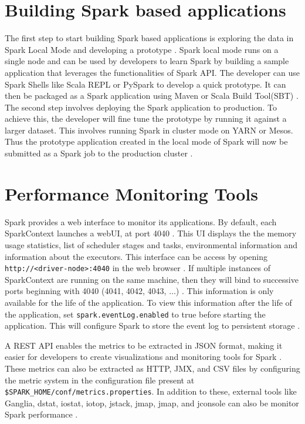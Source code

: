 \documentclass[9pt,twocolumn,twoside]{../../styles/osajnl}
\begin{document}
\section{Building Spark based applications}
The first step to start building Spark based applications is exploring
the data in Spark Local Mode and developing a prototype
\cite{www-hortonworks}. Spark local mode runs on a single node and can
be used by developers to learn Spark by building a sample application
that leverages the functionalities of Spark API. The developer can use
Spark Shells like Scala REPL or PySpark to develop a quick
prototype. It can then be packaged as a Spark application using Maven
or Scala Build Tool(SBT) \cite{www-hortonworks}.  The second step
involves deploying the Spark application to production. To achieve
this, the developer will fine tune the prototype by running it against
a larger dataset. This involves running Spark in cluster mode on YARN
or Mesos. Thus the prototype application created in the local mode of
Spark will now be submitted as a Spark job to the production cluster
\cite{www-hortonworks}.

\section{Performance Monitoring Tools}
Spark provides a web interface to monitor its applications. By
default, each SparkContext launches a webUI, at port 4040
\cite{www-spark-ui}. This UI displays the the memory usage statistics,
list of scheduler stages and tasks, environmental information and
information about the executors.  This interface can be access by
opening \texttt{http://<driver-node>:4040} in the web browser
\cite{www-spark-ui}.  If multiple instances of SparkContext are
running on the same machine, then they will bind to successive ports
beginning with 4040 (4041, 4042, 4043, $\ldots$)
\cite{www-spark-ui}. This information is only available for the life
of the application. To view this information after the life of the
application, set \texttt{spark.eventLog.enabled} to true before
starting the application.  This will configure Spark to store the
event log to persistent storage \cite{www-spark-ui}.

A REST API enables the metrics to be extracted in JSON format, making
it easier for developers to create visualizations and monitoring tools
for Spark \cite{www-spark-ui}.  These metrics can also be extracted as
HTTP, JMX, and CSV files by configuring the metric system in the
configuration file present at
\texttt{\$SPARK\_HOME/conf/metrics.properties}. In addition to these,
external tools like Ganglia, dstat, iostat, iotop, jstack, jmap, jmap,
and jconsole can also be monitor Spark performance
\cite{www-spark-ui}.
\end{document}
